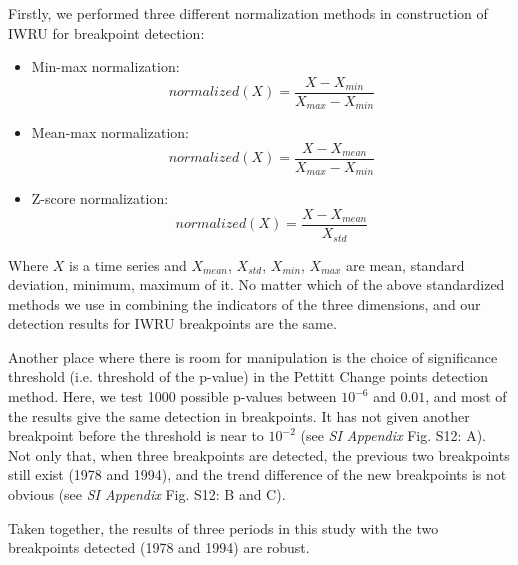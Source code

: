 \documentclass[9pt,twoside,lineno]{pnas-new}
\begin{document}
Firstly, we performed three different normalization methods in construction of IWRU for breakpoint detection:

\begin{itemize}
    \item Min-max normalization:
        $$ normalized(X) = \frac{X - X_{min}}{X_{max} - X_{min}} $$
    \item Mean-max normalization:
        $$ normalized(X) = \frac{X - X_{mean}}{X_{max} - X_{min}} $$
    \item Z-score normalization:
        $$ normalized(X) = \frac{X-X_{mean}}{X_{std}} $$ 
\end{itemize}

Where $X$ is a time series and $X_{mean}$, $X_{std}$, $X_{min}$, $X_{max}$ are mean, standard deviation, minimum, maximum of it.
No matter which of the above standardized methods we use in combining the indicators of the three dimensions, and our detection results for IWRU breakpoints are the same.

Another place where there is room for manipulation is the choice of significance threshold (i.e. threshold of the p-value) in the Pettitt Change points detection method. Here, we test 1000 possible p-values between $10^{-6}$ and $0.01$, and most of the results give the same detection in breakpoints. 
It has not given another breakpoint before the threshold is near to $10^{-2}$ (see \textit{SI Appendix} Fig. S12: A). 
Not only that, when three breakpoints are detected, the previous two breakpoints still exist (1978 and 1994), and the trend difference of the new breakpoints is not obvious (see \textit{SI Appendix} Fig. S12: B and C).

Taken together, the results of three periods in this study with the two breakpoints detected (1978 and 1994) are robust.

\end{document}
